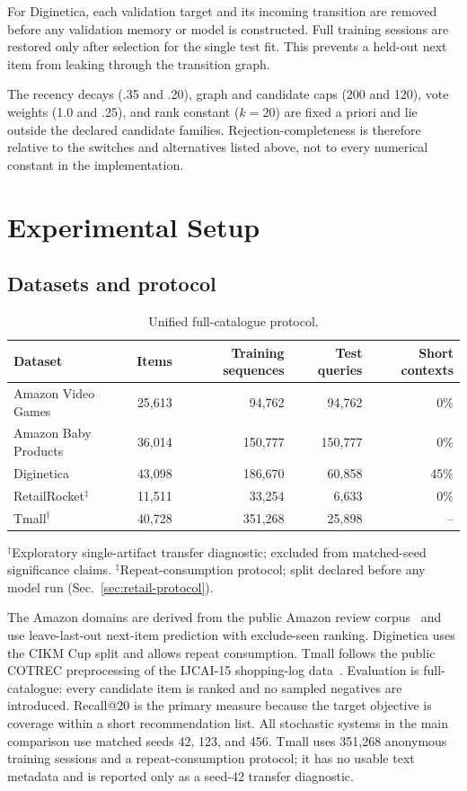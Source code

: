 \documentclass[runningheads]{llncs}
\begin{document}
For Diginetica, each validation target and its incoming transition are removed
before any validation memory or model is constructed. Full training sessions
are restored only after selection for the single test fit. This prevents a
held-out next item from leaking through the transition graph.

The recency decays (.35 and .20), graph and candidate caps (200 and 120),
vote weights (1.0 and .25), and rank constant ($k=20$) are fixed
a priori and lie outside the declared candidate families. Rejection-completeness
is therefore relative to the switches and alternatives listed above, not to
every numerical constant in the implementation.

\section{Experimental Setup}
\subsection{Datasets and protocol}
\begin{table}[t]
\caption{Unified full-catalogue protocol.}
\label{tab:data}\centering\small
\begin{tabular}{lrrrr}
\toprule Dataset & Items & Training sequences & Test queries & Short contexts \\
\midrule
Amazon Video Games & 25,613 & 94,762 & 94,762 & 0\% \\
Amazon Baby Products & 36,014 & 150,777 & 150,777 & 0\% \\
Diginetica & 43,098 & 186,670 & 60,858 & 45\% \\
RetailRocket$^{\ddagger}$ & 11,511 & 33,254 & 6,633 & 0\% \\
Tmall$^\dagger$ & 40,728 & 351,268 & 25,898 & -- \\
\bottomrule
\end{tabular}
\par\raggedright\scriptsize $^\dagger$Exploratory single-artifact transfer
diagnostic; excluded from matched-seed significance claims.
$^{\ddagger}$Repeat-consumption protocol; split declared before any model
run (Sec.~\ref{sec:retail-protocol}).
\end{table}

The Amazon domains are derived from the public Amazon review corpus~\cite{mcauley2015amazon} and use leave-last-out next-item prediction with
exclude-seen ranking. Diginetica uses the CIKM Cup split and allows repeat
consumption. Tmall follows the public COTREC preprocessing of the IJCAI-15
shopping-log data~\cite{xia2021cotrec}.
Evaluation is full-catalogue: every candidate item is ranked and no sampled
negatives are introduced. Recall@20 is the primary measure because the target
objective is coverage within a short recommendation list. All stochastic
systems in the main comparison use matched seeds 42, 123, and 456. Tmall uses
351,268 anonymous training sessions and a repeat-consumption protocol; it has
no usable text metadata and is reported only as a seed-42 transfer diagnostic.
\end{document}
